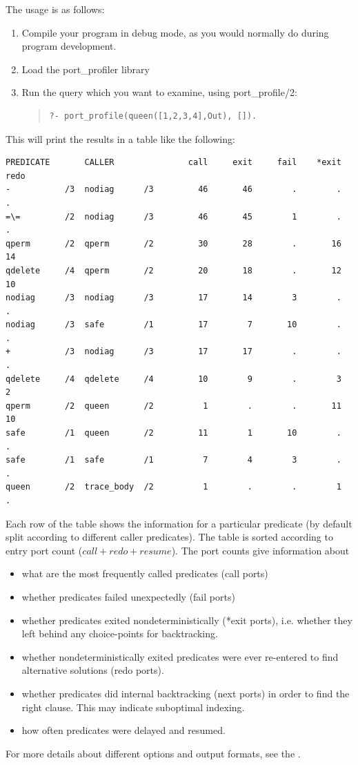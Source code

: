 The usage is as follows: 
\begin{enumerate}
\item Compile your program in debug mode, as you would normally do during program development.
\item Load the port_profiler library 
\item Run the query which you want to examine, using port_profile/2: 
\begin{quote}\begin{verbatim}
?- port_profile(queen([1,2,3,4],Out), []).
\end{verbatim}\end{quote}
\end{enumerate}
This will print the results in a table like the following:
\begin{verbatim}
PREDICATE       CALLER               call     exit     fail    *exit     redo
-           /3  nodiag      /3         46       46        .        .        .
=\=         /2  nodiag      /3         46       45        1        .        .
qperm       /2  qperm       /2         30       28        .       16       14
qdelete     /4  qperm       /2         20       18        .       12       10
nodiag      /3  nodiag      /3         17       14        3        .        .
nodiag      /3  safe        /1         17        7       10        .        .
+           /3  nodiag      /3         17       17        .        .        .
qdelete     /4  qdelete     /4         10        9        .        3        2
qperm       /2  queen       /2          1        .        .       11       10
safe        /1  queen       /2         11        1       10        .        .
safe        /1  safe        /1          7        4        3        .        .
queen       /2  trace_body  /2          1        .        .        1        .
\end{verbatim}
Each row of the table shows the information for a particular predicate
(by default split according to different caller predicates).
The table is sorted according to entry port count ($call+redo+resume$).
The port counts give information about
\begin{itemize}
\item what are the most frequently called predicates (call ports)
\item whether predicates failed unexpectedly (fail ports)
\item whether predicates exited nondeterministically (*exit ports), i.e.
    whether they left behind any choice-points for backtracking.
\item whether nondeterministically exited predicates were ever re-entered
    to find alternative solutions (redo ports).
\item whether predicates did internal backtracking (next ports) in order
    to find the right clause. This may indicate suboptimal indexing.
\item how often predicates were delayed and resumed.
\end{itemize}
For more details about different options and output formats, see
the .



